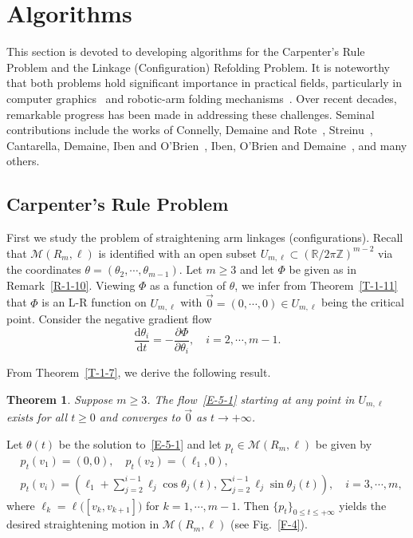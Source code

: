 \documentclass[11pt,letterpaper]{amsart}
\theoremstyle{plain}
\newtheorem{theorem}{Theorem}[section]
\theoremstyle{definition}
\theoremstyle{remark}
\numberwithin{equation}{section}
\begin{document}
\section{Algorithms}\label{S-5}
This section is devoted to developing algorithms for the Carpenter's Rule Problem and the Linkage (Configuration) Refolding Problem. It is noteworthy that both problems hold significant importance in practical fields, particularly in computer graphics~\cite{Hopcroft-1985,Alt-2003} and robotic-arm folding mechanisms~\cite{Farber-2008}. Over recent decades, remarkable progress has been made in addressing these challenges. Seminal contributions include the works of Connelly, Demaine and Rote~\cite{Connelly-2003}, Streinu~\cite{Streinu-2005}, Cantarella, Demaine, Iben and O'Brien~\cite{Cantarella-2004}, Iben, O'Brien and Demaine~\cite{Demaine-2009}, and many others.

\subsection{Carpenter's Rule Problem}
First we study the problem of straightening arm linkages (configurations). Recall that $\mathcal M(R_m,\ell)$ is identified with an open subset $U_{m,\ell}\subset \left(\mathbb R/2\pi\mathbb Z\right)^{m-2}$ via the coordinates $\theta=(\theta_2,\cdots,\theta_{m-1})$. Let $m\geq 3$ and let $\Phi$ be given as in Remark~\ref{R-1-10}. Viewing $\Phi$ as a function of $\theta$, we infer from Theorem~\ref{T-1-11} that $\Phi$ is an L-R function on $U_{m,\ell}$ with $\vec{0}=(0,\cdots,0)\in U_{m,\ell}$ being the critical point. Consider the negative gradient flow
\begin{equation}\label{E-5-1}
\frac{\mathrm d\theta_i}{\mathrm d t}=-\frac{\partial \Phi}{\partial \theta_i},\quad i=2,\cdots,m-1.
\end{equation}

From Theorem~\ref{T-1-7}, we derive the following result.

\begin{theorem}
Suppose $m\geq 3$. The flow~\eqref{E-5-1} starting at any point in $U_{m,\ell}$ exists for all $t\geq 0$ and converges to $\vec{0}$ as $t\to+\infty$.
\end{theorem}

Let $\theta(t)$ be the solution to~\eqref{E-5-1} and let $p_t\in \mathcal M(R_m,\ell)$ be given by
\[
\begin{aligned}
& p_t(v_1)=(0,0),\quad p_t(v_2)=(\ell_1,0),\\
& p_t(v_i)=
\left(\ell_1+\sum\nolimits_{j=2}^{i-1}\ell_j\cos\theta_j(t),
\sum\nolimits_{j=2}^{i-1}\ell_j\sin\theta_j(t)\right),\quad i=3,\cdots,m,
\end{aligned}
\]
where $\ell_k=\ell\big([v_k,v_{k+1}]\big)$ for $k=1,\cdots,m-1$. Then $\{p_t\}_{0\leq t\leq +\infty}$ yields the desired straightening motion in $\mathcal M(R_m,\ell)$ (see Fig.~\ref{F-4}).
\end{document}
